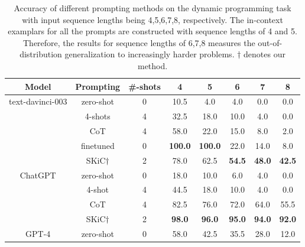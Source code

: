 \begin{table}[t]
\caption{Accuracy of different prompting methods on the dynamic programming task with input sequence lengths being 4,5,6,7,8, respectively. The in-context examplars for all the prompts are constructed with sequence lengths of 4 and 5. Therefore, the results for sequence lengths of 6,7,8 measures the out-of-distribution generalization to increasingly harder problems. $\dag$ denotes our method.} \label{Tab:dp_results}
\centering
\begin{tabular}{c|c|c|cc|ccc} \toprule
\textbf{Model}               & \textbf{Prompting}&\textbf{\#-shots} & \multicolumn{1}{c}{\textbf{4}} & \textbf{5}  & \textbf{6}  & \textbf{7}  & \textbf{8}  \\ \midrule\midrule 

\multirow{5}{*}{text-davinci-003} & zero-shot  &0        & 10.5                              & 4.0           & 4.0           & 0.0           & 0.0           \\
                          & 4-shots     &4       & 32.5                             & 18.0          & 10.0          & 4.0           & 0.0           \\
                          & CoT     &4           & 58.0                             & 22.0          & 15.0          & 8.0           & 2.0           \\
                          &finetuned & 0 &\textbf{100.0} &\textbf{100.0} &22.0 &14.0 &8.0\\
                          & SKiC$\dag$   &2             & 78.0                    & 62.5 & \textbf{54.5} & \textbf{48.0} & \textbf{42.5} \\ \midrule
\multirow{4}{*}{ChatGPT}  & zero-shot   &0       & 18.0                             & 10.0          & 6.0           & 4.0           & 0.0           \\
                          & 4-shot    &4         & 44.5                            & 18.0          & 10.0          & 4.0           & 0.0           \\
                          & CoT    &4            & 82.5                             & 76.0          & 72.0        & 64.0           & 55.5           \\
                          & SKiC$\dag$    &2            & \textbf{98.0}                    & \textbf{96.0} & \textbf{95.0} & \textbf{94.0} & \textbf{92.0} \\ \midrule
\multirow{4}{*}{GPT-4}     & zero-shot   &0       & 58.0                             & 42.5          & 35.5          & 28.0          & 12.0          \\

\end{tabular}
\end{table}

